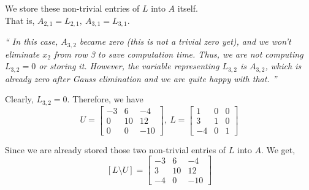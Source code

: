 	We store these non-trivial entries of $L$ into $A$ itself.\\
	That is, $A_{2,1} = L_{2,1},\ A_{3,1} = L_{3,1}$.\\

\begin{commentary}
	\textit{``
	In this case, $A_{3,2}$ became zero (this is not a trivial zero yet), and we won't eliminate $x_2$ from row 3 to save computation time.
	Thus, we are not computing $L_{3,2} = 0$ or storing it.
	However, the variable representing $L_{3,2}$ is $A_{3,2}$, which is already zero after Gauss elimination and we are quite happy with that.
	''}\\
\end{commentary}

	Clearly, $L_{3,2} = 0$.
	Therefore, we have
	\[ U = \begin{bmatrix} -3 & 6 & -4 \\ 0 & 10 & 12 \\ 0 & 0 & -10 \end{bmatrix},\ L = \begin{bmatrix} 1 & 0 & 0 \\ 3 & 1 & 0 \\ -4 & 0 & 1 \end{bmatrix} \]

		Since we are already stored those two non-trivial entries of $L$ into $A$.
		We get,
	\[ [L\text{\textbackslash{}}U] = \begin{bmatrix} -3 & 6 & -4 \\ 3 & 10 & 12 \\ -4 & 0 & -10 \end{bmatrix}\]
